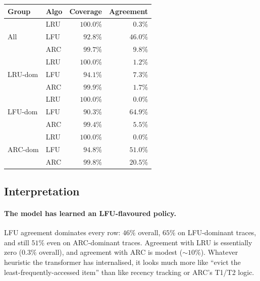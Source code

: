 \documentclass{article}
\begin{document}
\begin{center}
\begin{tabular}{llrr}
\toprule
Group & Algo & Coverage & Agreement \\
\midrule
\multirow{3}{*}{All} & LRU & $100.0\%$ & $\phantom{0}0.3\%$ \\
                    & LFU & $\phantom{0}92.8\%$  & $46.0\%$ \\
                    & ARC & $\phantom{0}99.7\%$  & $\phantom{0}9.8\%$ \\
\midrule
\multirow{3}{*}{LRU-dom} & LRU & $100.0\%$ & $\phantom{0}1.2\%$ \\
                         & LFU & $\phantom{0}94.1\%$  & $\phantom{0}7.3\%$ \\
                         & ARC & $\phantom{0}99.9\%$  & $\phantom{0}1.7\%$ \\
\midrule
\multirow{3}{*}{LFU-dom} & LRU & $100.0\%$ & $\phantom{0}0.0\%$ \\
                         & LFU & $\phantom{0}90.3\%$  & $64.9\%$ \\
                         & ARC & $\phantom{0}99.4\%$  & $\phantom{0}5.5\%$ \\
\midrule
\multirow{3}{*}{ARC-dom} & LRU & $100.0\%$ & $\phantom{0}0.0\%$ \\
                         & LFU & $\phantom{0}94.8\%$  & $51.0\%$ \\
                         & ARC & $\phantom{0}99.8\%$  & $20.5\%$ \\
\bottomrule
\end{tabular}
\end{center}

\subsection{Interpretation}

\paragraph{The model has learned an LFU-flavoured policy.} LFU agreement
dominates every row: $46\%$ overall, $65\%$ on LFU-dominant traces, and
still $51\%$ even on ARC-dominant traces. Agreement with LRU is essentially
zero ($0.3\%$ overall), and agreement with ARC is modest ($\sim\!10\%$).
Whatever heuristic the transformer has internalised, it looks much more like
``evict the least-frequently-accessed item'' than like recency tracking or
ARC's T1/T2 logic.
\end{document}
